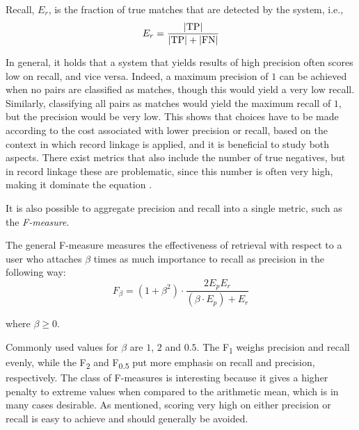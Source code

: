 \begin{definition}[Recall]
    Recall, $E_{r}$, is the fraction of true matches that are detected by the system, i.e.,
    \begin{equation*}
        E_{r} = \frac{ \lvert\text{TP}\rvert }{ \lvert\text{TP}\rvert + \lvert\text{FN}\rvert }
    \end{equation*}
\end{definition}

In general, it holds that a system that yields results of high precision often scores low on recall, and vice versa.
Indeed, a maximum precision of $1$ can be achieved when no pairs are classified as matches, though this would yield a very low recall.
Similarly, classifying all pairs as matches would yield the maximum recall of $1$, but the precision would be very low.
This shows that choices have to be made according to the cost associated with lower precision or recall, based on the context in which record linkage is applied, and it is beneficial to study both aspects.
There exist metrics that also include the number of true negatives, but in record linkage these are problematic, since this number is often very high, making it dominate the equation \citep{Christen2012}.

It is also possible to aggregate precision and recall into a single metric, such as the \emph{F-measure}.

\begin{definition}[F-measure]
    The general F-measure measures the effectiveness of retrieval with respect to a user who attaches $\beta$ times as much importance to recall as precision \citep{Rijsbergen1979} in the following way:
    \begin{equation*}
        F_{\beta} = (1 + \beta^{2}) \cdot \frac{2 E_{p} E_{r}}{(\beta \cdot E_{p}) + E_{r}}
    \end{equation*}
    \label{def:fmeasure}
\end{definition}

\noindent where $\beta \geq 0$.

Commonly used values for $\beta$ are $1$, $2$ and $0.5$. The F\textsubscript{1} weighs precision and recall evenly, while the F\textsubscript{2} and F\textsubscript{0.5} put more emphasis on recall and precision, respectively.
The class of F-measures is interesting because it gives a higher penalty to extreme values when compared to the arithmetic mean, which is in many cases desirable.
As mentioned, scoring very high on either precision or recall is easy to achieve and should generally be avoided.

